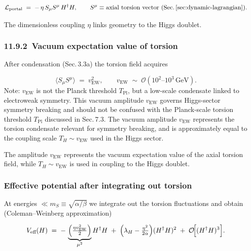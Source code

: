\documentclass{article}
\newcommand{\vEW}{v_{\mathrm{EW}}}
\begin{document}
\begin{equation}
  \mathcal L_{\text{portal}}
  \;=\;
  -\,\eta\,
  S_{\mu}S^{\mu}\,
  H^{\dagger}H,
  \qquad
  S^{\mu}\equiv\text{axial torsion vector (Sec.\,\ref{sec:dynamic-lagrangian})}.
  \label{eq:portal}
\end{equation}

The dimensionless coupling $\eta$ links geometry to the Higgs doublet.

\subsubsection*{11.9.2 Vacuum expectation value of torsion}

After condensation (Sec.\,3.3a) the torsion field acquires

\[
  \langle S_{\mu}S^{\mu}\rangle \;=\; v_{\text{EW}}^{2},
  \qquad
  v_{\text{EW}}\;\sim\;\mathcal O(10^{2}\text{--}10^{3}\,\mathrm{GeV}).
\]
Note: $v_{\text{EW}}$ is not the Planck threshold $T_{\mathrm{Pl}}$, but a low-scale condensate linked to electroweak symmetry.
This vacuum amplitude $v_{\text{EW}}$
 governs Higgs-sector symmetry breaking and should not be confused with the Planck-scale torsion threshold $T_{\mathrm{Pl}}$ discussed in Sec. 7.3.
The vacuum amplitude $v_{\text{EW}}$ represents the torsion condensate relevant for symmetry breaking, and is approximately equal to the coupling scale $T_H \sim v_{\text{EW}}$ used in the Higgs sector.


 The amplitude $\vEW$ represents the vacuum expectation value of the axial torsion field, while $T_H \sim \vEW$ is used in coupling to the Higgs doublet.
\subsubsection { Effective potential after integrating out torsion}

At energies $\ll m_{S}\equiv\sqrt{\alpha/\beta}$ we integrate out the
torsion fluctuations and obtain (Coleman–Weinberg approximation)

\begin{equation}
  V_{\text{eff}}(H)
  \;=\;
  -\,\underbrace{\Bigl(\tfrac{\eta \vEW^2}{2}\Bigr)}_{\mu^{2}}
      H^{\dagger}H
  \;+\;
  \Bigl(\lambda_{H}-\tfrac{\eta^{2}}{2\alpha}\Bigr)
      (H^{\dagger}H)^{2}
  \;+\;
  \mathcal O\!\Bigl[(H^{\dagger}H)^{3}\Bigr].
  \label{eq:Veff}
\end{equation}
\end{document}

